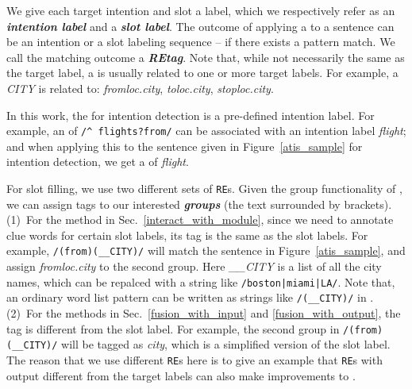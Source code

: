 We give each target intention and slot a label, which we respectively refer as an \emph{\textbf{intention label}} and a \emph{\textbf{slot
label}}. The outcome of applying a \RE to a sentence can be an intention or a slot labeling sequence -- if there exists a pattern match. We
call the matching outcome a \emph{\textbf{REtag}}.
Note that, while not necessarily the same as the target label, a \REtag is usually related to one or more target labels. For example, a
\REtag \emph{CITY} is related to: \emph{fromloc.city}, \emph{toloc.city}, \emph{stoploc.city}. 

In this work, the \REtag for intention detection is a pre-defined intention label. For example, an \RE of \texttt{/\textasciicircum
flights?\:from/} can be associated with an intention label \emph{flight}; and when applying this \RE to the sentence given in
Figure~\ref{atis_sample} for intention detection, we get a \REtag of \emph{flight}.

For slot filling, we use two different sets of \texttt{RE}s. Given the group functionality of \RE, we can assign tags to our interested
\textbf{\emph{\RE groups}} (the text surrounded by brackets). (1)~For the method in Sec.~\ref{interact_with_module}, since we need to
annotate clue words for certain slot labels, its \RE tag is the same as the slot labels. For example, \texttt{/(from)\:(\_\_CITY)/} will
match the sentence in Figure~\ref{atis_sample}, and assign \emph{fromloc.city} to the second \RE group. Here \emph{\_\_CITY} is a list of
all the city names, which can be repalced with a string like \texttt{/boston|miami|LA/}. Note that, an ordinary word list pattern can be
written as strings like \texttt{/(\_\_CITY)/} in \RE. (2)~For the methods in Sec.~\ref{fusion_with_input} and \ref{fusion_with_output}, the
\RE tag is different from the slot label. For example, the second \RE group in \texttt{/(from)\:(\_\_CITY)/} will be tagged as \emph{city},
which is a simplified version of the slot label. The reason that we use different \texttt{RE}s here is to give an example that \texttt{RE}s
with output different from the target labels can also make improvements to \NN.

